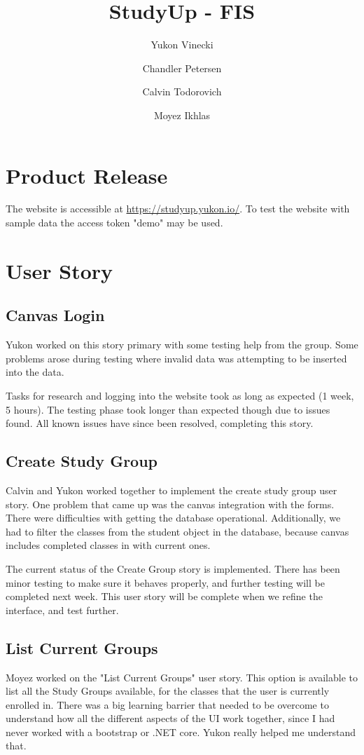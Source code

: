 \documentclass[12pt,letterpaper]{article}
\title{StudyUp - FIS}
\author[1]{Yukon Vinecki}
\author[2]{Chandler Petersen}
\author[3]{Calvin Todorovich}
\author[4]{Moyez Ikhlas}
\affil[1]{vineckiy, EECS - Oregon State University}
\affil[2]{petercha, EECS - Oregon State University}
\affil[3]{todorovc, EECS - Oregon State University}
\affil[4]{ikhlasm, EECS - Oregon State University}
\begin{document}
\maketitle
\clearpage
\tableofcontents
\clearpage
{}

\section{Product Release}

The website is accessible at \url{https://studyup.yukon.io/}. To test the website with sample data the access token "demo" may be used.

\section{User Story}
\subsection{Canvas Login}
Yukon worked on this story primary with some testing help from the group. Some problems arose during testing where invalid data was attempting to be inserted into the data.

Tasks for research and logging into the website took as long as expected (1 week, 5 hours). The testing phase took longer than expected though due to issues found. All known issues have since been resolved, completing this story.

\subsection{Create Study Group}
Calvin and Yukon worked together to implement the create study group user story. One problem that came up was the canvas integration with the forms. There were difficulties with getting the database operational. Additionally, we had to filter the classes from the student object in the database, because canvas includes completed classes in with current ones.

The current status of the Create Group story is implemented. There has been minor testing to make sure it behaves properly, and further testing will be completed next week. This user story will be complete when we refine the interface, and test further.

\subsection{List Current Groups}
Moyez worked on the "List Current Groups" user story. This option is available to list all the Study Groups available, for the classes that the user is currently enrolled in. There was a big learning barrier that needed to be overcome to understand how all the different aspects of the UI work together, since I had never worked with a bootstrap or .NET core. Yukon really helped me understand that. 
\end{document}
